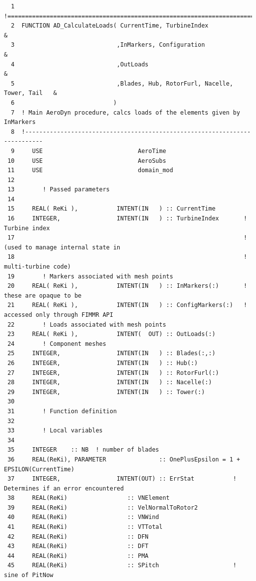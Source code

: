 \documentclass[11pt]{article}
\begin{document}
{\scriptsize
\begin{verbatim}
  1  !===========================================================================
  2  FUNCTION AD_CalculateLoads( CurrentTime, TurbineIndex                      &
  3                             ,InMarkers, Configuration                       &
  4                             ,OutLoads                                       &
  5                             ,Blades, Hub, RotorFurl, Nacelle, Tower, Tail   &
  6                            )
  7  ! Main AeroDyn procedure, calcs loads of the elements given by InMarkers
  8  !---------------------------------------------------------------------------
  9     USE                           AeroTime 
 10     USE                           AeroSubs
 11     USE                           domain_mod
 12  
 13        ! Passed parameters
 14  
 15     REAL( ReKi ),           INTENT(IN   ) :: CurrentTime
 16     INTEGER,                INTENT(IN   ) :: TurbineIndex       ! Turbine index 
 17                                                                 ! (used to manage internal state in 
 18                                                                 !  multi-turbine code)
 19        ! Markers associated with mesh points
 20     REAL( ReKi ),           INTENT(IN   ) :: InMarkers(:)       ! these are opaque to be
 21     REAL( ReKi ),           INTENT(IN   ) :: ConfigMarkers(:)   ! accessed only through FIMMR API
 22        ! Loads associated with mesh points
 23     REAL( ReKi ),           INTENT(  OUT) :: OutLoads(:)
 24        ! Component meshes
 25     INTEGER,                INTENT(IN   ) :: Blades(:,:)        
 26     INTEGER,                INTENT(IN   ) :: Hub(:)
 27     INTEGER,                INTENT(IN   ) :: RotorFurl(:)
 28     INTEGER,                INTENT(IN   ) :: Nacelle(:)
 29     INTEGER,                INTENT(IN   ) :: Tower(:)
 30  
 31        ! Function definition
 32  
 33        ! Local variables
 34  
 35     INTEGER    :: NB  ! number of blades
 36     REAL(ReKi), PARAMETER               :: OnePlusEpsilon = 1 + EPSILON(CurrentTime)
 37     INTEGER,                INTENT(OUT) :: ErrStat           ! Determines if an error encountered
 38     REAL(ReKi)                 :: VNElement
 39     REAL(ReKi)                 :: VelNormalToRotor2
 40     REAL(ReKi)                 :: VNWind
 41     REAL(ReKi)                 :: VTTotal
 42     REAL(ReKi)                 :: DFN
 43     REAL(ReKi)                 :: DFT
 44     REAL(ReKi)                 :: PMA
 45     REAL(ReKi)                 :: SPitch                     ! sine of PitNow

\end{verbatim}}
\end{document}

